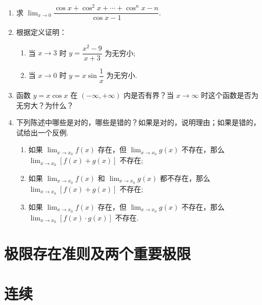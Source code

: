 \begin{enumerate}
    \item  求 $\displaystyle\lim_{x\to0}\dfrac{\cos x+\cos^2x+\cdots+\cos^n x-n}{\cos x-1}$.
    
    \item 根据定义证明：
    \begin{enumerate}[(1)]\setlength{\itemsep}{5pt}\setlength{\topsep}{15pt}
        \item 当 $x \to 3$ 时 $y=\dfrac{x^2-9}{x+3}$ 为无穷小;
        \item 当 $x \to 0$ 时 $y=x\sin\dfrac{1}{x}$ 为无穷小.
    \end{enumerate}
    
    \item 函数 $y=x\cos x$ 在 $(-\infty, +\infty)$ 内是否有界？当 $x\to\infty$ 时这个函数是否为无穷大？为什么？
    
    \item 下列陈述中哪些是对的，哪些是错的？如果是对的，说明理由；如果是错的，试给出一个反例.
    \begin{enumerate}[(1)]\setlength{\itemsep}{5pt}\setlength{\topsep}{15pt}
        \item 如果 $\displaystyle\lim_{x\to x_0}f(x)$ 存在，但 $\displaystyle\lim_{x\to x_0}g(x)$ 不存在，那么 $\displaystyle\lim_{x\to x_0}[f(x)+g(x)]$ 不存在;
        \item 如果 $\displaystyle\lim_{x\to x_0}f(x)$ 和 $\displaystyle\lim_{x\to x_0}g(x)$ 都不存在，那么 $\displaystyle\lim_{x\to x_0}[f(x)+g(x)]$ 不存在;
        \item 如果 $\displaystyle\lim_{x\to x_0}f(x)$ 存在，但 $\displaystyle\lim_{x\to x_0}g(x)$ 不存在，那么 $\displaystyle\lim_{x\to x_0}[f(x) \cdot g(x)]$ 不存在.
    \end{enumerate}



\end{enumerate}

\section{极限存在准则及两个重要极限}


\section{连续}